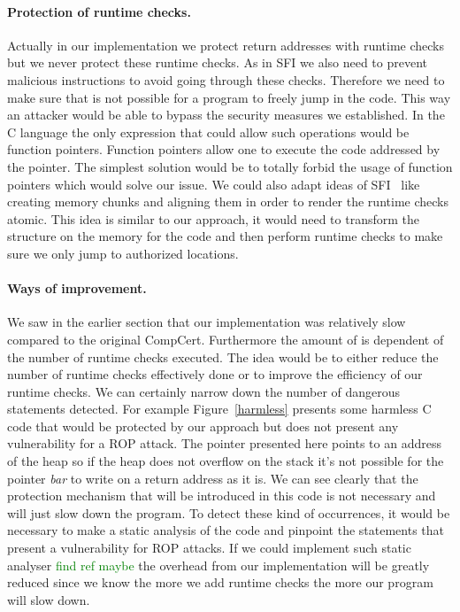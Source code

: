 \documentclass[11pt]{sdm}
\begin{document}
\paragraph{Protection of runtime checks.}
\label{par:Protection of runtime checks}
Actually in our implementation we protect return addresses with runtime checks but we never protect these runtime checks. As in SFI we also need to prevent malicious instructions to avoid going through these checks. Therefore we need to make sure that is not possible for a program to freely jump in the code. This way an attacker would be able to bypass the security measures we established.
In the C language the only expression that could allow such operations would be function pointers. Function pointers allow one to execute the code addressed by the pointer.
The simplest solution would be to totally forbid the usage of function pointers which would solve our issue.
We could also adapt ideas of SFI~\cite{Mccamant_evaluatingsfi} like creating memory chunks and aligning them in order to render the runtime checks atomic. This idea is similar to our approach, it would need to transform the structure on the memory for the code and then perform runtime checks to make sure we only jump to authorized locations.

\paragraph{Ways of improvement.}
\label{par:improvement}
We saw in the earlier section that our implementation was relatively slow compared to the original CompCert. Furthermore the amount of is dependent of the number of runtime checks executed.
The idea would be to either reduce the number of runtime checks effectively done or to improve the efficiency of our runtime checks.
We can certainly narrow down the number of dangerous statements detected. For example Figure~\ref{harmless} presents some harmless C code that would be protected by our approach but does not present any vulnerability for a ROP attack. The pointer presented here points to an address of the heap so if the heap does not overflow on the stack it's not possible for the pointer \textit{bar} to write on a return address as it is.
We can see clearly that the protection mechanism that will be introduced in this code is not necessary and will just slow down the program.
To detect these kind of occurrences, it would be necessary to make a static analysis of the code and pinpoint the statements that present a vulnerability for ROP attacks.
If we could implement such static analyser \textcolor{green}{find ref maybe} the overhead from our implementation will be greatly reduced since we know the more we add runtime checks the more our program will slow down.
\end{document}
